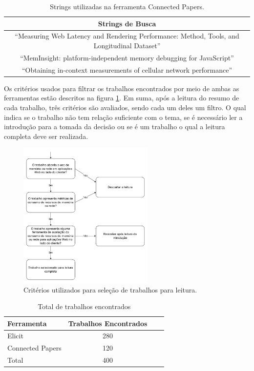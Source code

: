 \documentclass[12pt]{tcc}
\begin{document}
	\begin{table}[h!]
	\centering

	\caption{Strings utilizadas na ferramenta Connected Papers.}
	\begin{tabular}{||c||} 

	\hline
		Strings de Busca \\
	\hline\hline
	``Measuring Web Latency and Rendering Performance: Method, Tools, and Longitudinal Dataset''\\
	``MemInsight: platform-independent memory debugging for JavaScript''\\
	``Obtaining in-context measurements of cellular network performance''\\
	\hline
	\end{tabular}
	\label{tab:strings-connected-papers}
	\end{table}

	Os critérios usados para filtrar os trabalhos encontrados por meio de ambas as ferramentas estão descritos na figura \ref{fig:fluxo-leitura}.
	Em suma, após a leitura do resumo de cada trabalho, três critérios são avaliados, sendo cada um deles um filtro.
	O qual indica se o trabalho não tem relação suficiente com o tema, se é necessário ler a introdução para a tomada da decisão ou se é um trabalho o qual a leitura completa deve ser realizada.

	\begin{figure}[!ht]
		\centering
		\includegraphics[width=0.6\textwidth]{figures/fluxo-decisao-leitura.pdf}
		\caption{Critérios utilizados para seleção de trabalhos para leitura.}
		\label{fig:fluxo-leitura}
	\end{figure}


	\begin{table}[!ht]
		\centering
		\caption{Total de trabalhos encontrados}
		\begin{tabular}{l  c L{1.5cm} R{1.5cm}}
			\toprule
			\textbf{Ferramenta} & \textbf{Trabalhos Encontrados} \\
			\midrule
			Elicit  &  280  \\
			Connected Papers  &  120  \\
			\midrule
			Total  &  400  \\
			\bottomrule
		\end{tabular}
		\label{tab:trabalhos-encontrados}
	\end{table}
\end{document}
